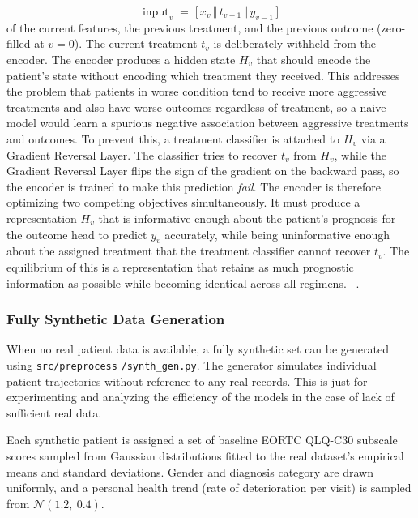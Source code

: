 \documentclass{article}
\begin{document}
\begin{equation}
    \mathrm{input}_v \;=\; \bigl[\, x_v \,\Vert\, t_{v-1} \,\Vert\, y_{v-1}\,\bigr]
    \label{eq:crn_input}
\end{equation}
of the current features, the previous treatment, and the previous
outcome (zero-filled at $v=0$). The current treatment $t_v$ is
deliberately withheld from the encoder. The encoder produces a hidden
state $H_v$ that should encode the patient's state without encoding
which treatment they received. This addresses the problem that patients in worse condition tend to receive more aggressive treatments and also have worse outcomes regardless of treatment, so a naive model would learn a spurious negative association between aggressive treatments and outcomes. To prevent this, a
treatment classifier is attached to $H_v$ via a Gradient Reversal Layer. The classifier tries to recover $t_v$ from
$H_v$, while the Gradient Reversal Layer flips the sign of the gradient on the backward
pass, so the encoder is trained to make this prediction \emph{fail}.
The encoder is therefore optimizing two competing objectives simultaneously. It must produce a representation $H_v$
that is informative enough about the patient's prognosis for the outcome head to predict $y_v$ accurately, while being uninformative enough about the assigned treatment that the treatment classifier cannot recover $t_v$.
The equilibrium of this is a representation that retains as much prognostic information as possible while becoming identical across all regimens.
~\cite{bica2020estimatingcounterfactualtreatmentoutcomes}. 


\subsubsection{Fully Synthetic Data Generation}

When no real patient data is available, a fully synthetic set can be generated using \texttt{src/preprocess} \texttt{/synth\_gen.py}. The generator simulates individual patient trajectories without reference to any real records. This is just for experimenting and analyzing the efficiency of the models in the case of lack of sufficient real data.

Each synthetic patient is assigned a set of baseline EORTC QLQ-C30 subscale scores sampled from Gaussian distributions fitted to the real dataset's empirical means and standard deviations. Gender and diagnosis category are drawn uniformly, and a personal health trend (rate of deterioration per visit) is sampled from $\mathcal{N}(1.2,\ 0.4)$.
\end{document}
